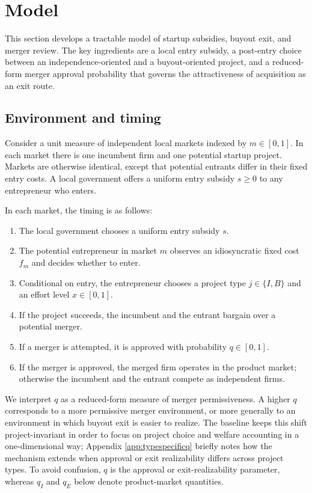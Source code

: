 \section{Model}\label{sec:model}

This section develops a tractable model of startup subsidies, buyout exit, and merger review.
The key ingredients are a local entry subsidy, a post-entry choice between an independence-oriented and a buyout-oriented project, and a reduced-form merger approval probability that governs the attractiveness of acquisition as an exit route.

\subsection{Environment and timing}

Consider a unit measure of independent local markets indexed by \(m \in [0,1]\).
In each market there is one incumbent firm and one potential startup project.
Markets are otherwise identical, except that potential entrants differ in their fixed entry costs.
A local government offers a uniform entry subsidy \(s \ge 0\) to any entrepreneur who enters.

In each market, the timing is as follows:

\begin{enumerate}
    \item The local government chooses a uniform entry subsidy \(s\).
    \item The potential entrepreneur in market \(m\) observes an idiosyncratic fixed cost \(f_m\) and decides whether to enter.
    \item Conditional on entry, the entrepreneur chooses a project type \(j \in \{I,B\}\) and an effort level \(x \in [0,1]\).
    \item If the project succeeds, the incumbent and the entrant bargain over a potential merger.
    \item If a merger is attempted, it is approved with probability \(q \in [0,1]\).
    \item If the merger is approved, the merged firm operates in the product market; otherwise the incumbent and the entrant compete as independent firms.
\end{enumerate}

We interpret \(q\) as a reduced-form measure of merger permissiveness.
A higher \(q\) corresponds to a more permissive merger environment, or more generally to an environment in which buyout exit is easier to realize.
The baseline keeps this shift project-invariant in order to focus on project choice and welfare accounting in a one-dimensional way; Appendix \ref{app:typespecificq} briefly notes how the mechanism extends when approval or exit realizability differs across project types.
To avoid confusion, \(q\) is the approval or exit-realizability parameter, whereas \(q_I\) and \(q_E\) below denote product-market quantities.

